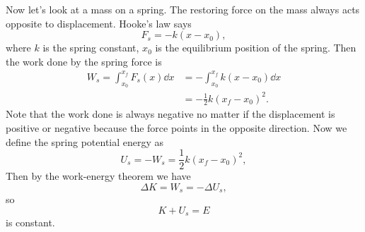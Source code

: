 \documentclass[../classical_mechanics.tex]{subfiles}
\begin{document}
        Now let's look at a mass on a spring. The restoring force on the mass always acts opposite to displacement. Hooke's law says
        \begin{equation}
            F_s=-k(x-x_0),
        \end{equation}
        where $k$ is the spring constant, $x_0$ is the equilibrium position of the spring.
        Then the work done by the spring force is
        \begin{align}
            W_s=\int_{x_0}^{x_f}F_s(x)\dd{x}&=-\int_{x_0}^{x_f}k(x-x_0)\dd{x}\\
            &=-\frac{1}{2}k(x_f-x_0)^2.
        \end{align}
        Note that the work done is always negative no matter if the displacement is positive or negative because the force points in the opposite direction.
        Now we define the spring potential energy as
        \begin{equation}
            U_s=-W_s=\frac{1}{2}k(x_f-x_0)^2,
        \end{equation}
        Then by the work-energy theorem we have
        \begin{equation}
            \Delta K=W_s=-\Delta U_s,
        \end{equation}
        so
        \begin{equation}
            K+U_s=E
        \end{equation}
        is constant.

\end{document}
